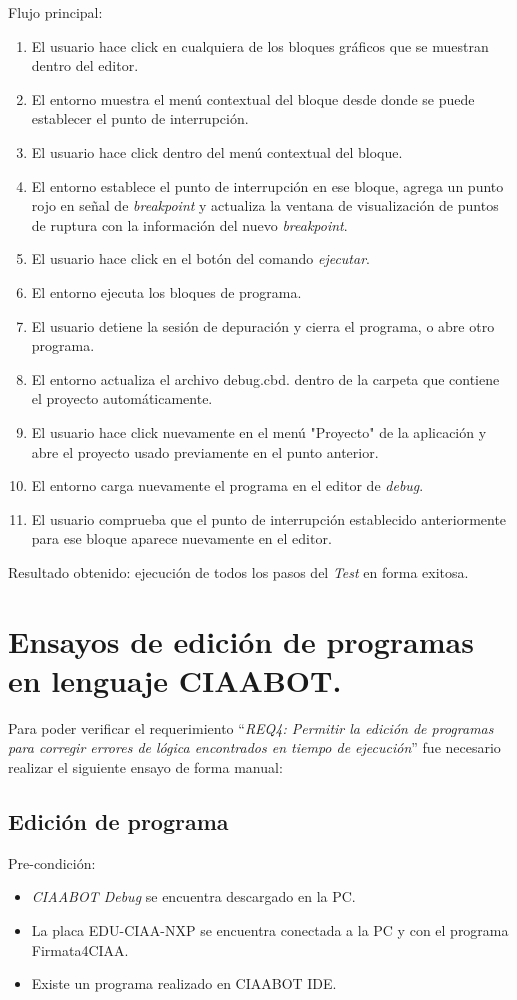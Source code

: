 Flujo principal:
\begin{enumerate}
    \item
	El usuario hace click en cualquiera de los bloques gráficos que se muestran dentro del editor.
	\item
	El entorno muestra el menú contextual del bloque desde donde se puede establecer el punto de interrupción.
	\item
	El usuario hace click dentro del menú contextual del bloque.
	\item
	El entorno establece el punto de interrupción en ese bloque, agrega un punto rojo en señal de \emph{breakpoint} y actualiza la ventana de visualización de puntos de ruptura con la información del nuevo \emph{breakpoint}.
	\item
	El usuario hace click en el botón del comando \emph{ejecutar}.
	\item
	El entorno ejecuta los bloques de programa.
	\item
    El usuario detiene la sesión de depuración y cierra el programa, o abre otro programa.
	\item
	El entorno actualiza el archivo debug.cbd. dentro de la carpeta que contiene el proyecto automáticamente.
	\item
	El usuario hace click nuevamente en el menú "Proyecto" de la aplicación y abre el proyecto usado previamente  en el punto anterior.
	\item
	El entorno carga nuevamente el programa en el editor de \emph{debug}.
	\item
	El usuario comprueba que el punto de interrupción establecido anteriormente para ese bloque aparece nuevamente en el editor.
	
\end{enumerate}

Resultado obtenido: ejecución de todos los pasos del \emph{Test} en forma exitosa. 


\section{Ensayos de edición de programas en lenguaje CIAABOT.}
\label{sec:Ensayos de edición de programas en lenguaje CIAABOT.}

Para poder verificar el requerimiento “\emph{REQ4: Permitir la edición de programas para corregir errores de lógica encontrados en tiempo de ejecución}”
fue necesario realizar el siguiente ensayo de forma manual:

\subsection{Edición de programa}
Pre-condición:
\begin{itemize}
	\item \emph{CIAABOT Debug} se encuentra descargado en la PC.
	\item La placa EDU-CIAA-NXP se encuentra conectada a la PC y con el programa Firmata4CIAA.
	\item Existe un programa realizado en CIAABOT IDE.
\end{itemize}

